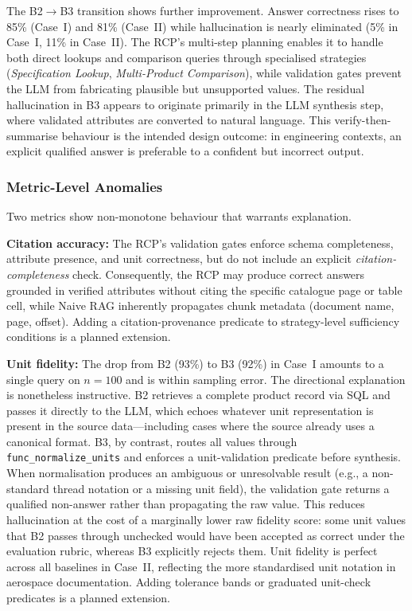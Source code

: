 \documentclass[largeformat]{interact}
\begin{document}
The B2$\rightarrow$B3 transition shows further improvement. Answer correctness rises to 85\% (Case~I) and 81\% (Case~II) while hallucination is nearly eliminated (5\% in Case~I, 11\% in Case~II). The RCP's multi-step planning enables it to handle both direct lookups and comparison queries through specialised strategies (\emph{Specification Lookup}, \emph{Multi-Product Comparison}), while validation gates prevent the LLM from fabricating plausible but unsupported values. The residual hallucination in B3 appears to originate primarily in the LLM synthesis step, where validated attributes are converted to natural language. This verify-then-summarise behaviour is the intended design outcome: in engineering contexts, an explicit qualified answer is preferable to a confident but incorrect output.

\subsubsection{Metric-Level Anomalies}
\label{subsubsection:metric_anomalies}
Two metrics show non-monotone behaviour that warrants explanation.
 
\textbf{Citation accuracy:} The RCP's validation gates enforce schema completeness, attribute presence, and unit correctness, but do not include an explicit \emph{citation-completeness} check. Consequently, the RCP may produce correct answers grounded in verified attributes without citing the specific catalogue page or table cell, while Naive RAG inherently propagates chunk metadata (document name, page, offset). Adding a citation-provenance predicate to strategy-level sufficiency conditions is a planned extension.
 
\textbf{Unit fidelity:} The drop from B2 (93\%) to B3 (92\%) in Case~I amounts to a single query on $n = 100$ and is within sampling error. The directional explanation is nonetheless instructive. B2 retrieves a complete product record via SQL and passes it directly to the LLM, which echoes whatever unit representation is present in the source data---including cases where the source already uses a canonical format. B3, by contrast, routes all values through \texttt{func\_normalize\_units} and enforces a unit-validation predicate before synthesis. When normalisation produces an ambiguous or unresolvable result (e.g., a non-standard thread notation or a missing unit field), the validation gate returns a qualified non-answer rather than propagating the raw value. This reduces hallucination at the cost of a marginally lower raw fidelity score: some unit values that B2 passes through unchecked would have been accepted as correct under the evaluation rubric, whereas B3 explicitly rejects them. Unit fidelity is perfect across all baselines in Case~II, reflecting the more standardised unit notation in aerospace documentation. Adding tolerance bands or graduated unit-check predicates is a planned extension.
\end{document}
